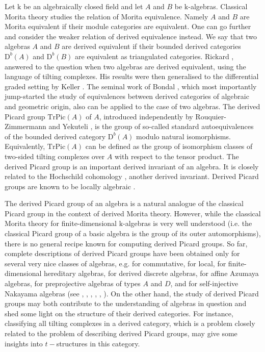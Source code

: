 \documentclass[12pt]{amsart}
\theoremstyle{plain}
\theoremstyle{remark}
\theoremstyle{definition}
\newcommand{\TrPic}{{\mathrm{TrPic}}}
\newcommand{\D}{{\mathrm{D}}}
\def\kk{\mathrm{k}}
\begin{document}

Let $\kk$ be an algebraically closed field and let $A$ and $B$ be $\kk$-algebras. Classical Morita theory studies the relation of Morita equivalence. Namely $A$ and $B$ are Morita equivalent if their module categories are equivalent. One can go further and consider the weaker relation of derived equivalence instead. We say that two algebras $A$ and $B$ are derived equivalent if their bounded derived categories $\D^b(A)$ and $\D^b(B)$ are equivalent as triangulated categories. Rickard \cite{R}, \cite{R2} answered to the question when two algebras are derived equivalent, using the language of tilting complexes. His results were then generalised to the differential graded setting by Keller \cite{K}. The seminal work of Bondal \cite{Bo}, which most importantly jump-started the study of equivalences between derived categories of algebraic and geometric origin, also can be applied to the case of two algebras. The derived Picard group $\TrPic(A)$ of $A$, introduced independently by Rouquier-Zimmermann \cite{RZ} and Yekuteli \cite{Y}, is the group of so-called standard autoequivalences of the bounded derived category $\D^b(A)$ modulo natural isomorphisms. Equivalently, $\TrPic(A)$ can be defined as the group of isomorphism classes of two-sided tilting complexes over $A$ with respect to the tensor product. The derived Picard group is an important derived invariant of an algebra. It is closely related to the Hochschild cohomology \cite{K2}, another derived invariant. Derived Picard groups are known to be locally algebraic \cite{Y}. 

The derived Picard group of an algebra is a natural analogue of the classical Picard group in the context of derived Morita theory. However, while the classical Morita theory for finite-dimensional $\kk$-algebras is very well understood (i.e. the classical Picard group of a basic algebra is the group of its outer automorphisms), there is no general recipe known for computing derived Picard groups. So far, complete descriptions of derived Picard groups have been obtained only for several very nice classes of algebras, e.g. for commutative, for local, for finite-dimensional hereditary algebras, for derived discrete algebras, for affine Azumaya algebras, for preprojective algebras of types $A$ and $D$, and for self-injective Nakayama algebras (see \cite{RZ}, \cite{MY}, \cite{BPP}, \cite{Ne}, \cite{Miz}, \cite{VZ1}). On the other hand, the study of derived Picard groups may both contribute to the understanding of algebras in question and shed some light on the structure of their derived categories. For instance, classifying all tilting complexes in a derived category, which is a problem closely related to the problem of describing derived Picard groups, may give some insights into $t-$structures in this category.  
\end{document}
